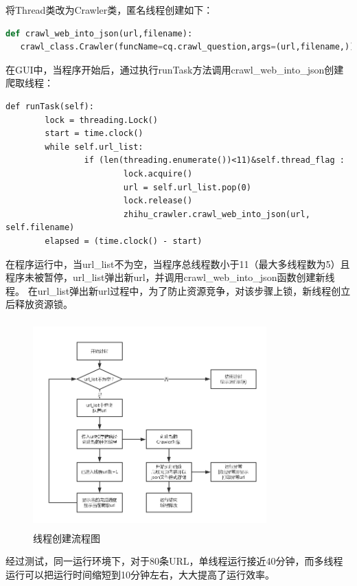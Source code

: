 \documentclass[UTF-8,a4paper, 12pt]{article}
\numberwithin{equation}{section}
\begin{document}
将Thread类改为Crawler类，匿名线程创建如下：
\begin{lstlisting}[language=python]
def crawl_web_into_json(url,filename):
   crawl_class.Crawler(funcName=cq.crawl_question,args=(url,filename,)).start()

\end{lstlisting}
在GUI中，当程序开始后，通过执行runTask方法调用crawl\_web\_into\_json创建爬取线程：
\begin{lstlisting}[]
def runTask(self):
		lock = threading.Lock()
		start = time.clock()
		while self.url_list:
				if (len(threading.enumerate())<11)&self.thread_flag :
						lock.acquire()
						url = self.url_list.pop(0)
						lock.release()
						zhihu_crawler.crawl_web_into_json(url, self.filename)
		elapsed = (time.clock() - start)

\end{lstlisting}

在程序运行中，当url\_list不为空，当程序总线程数小于11（最大多线程数为5）且程序未被暂停，url\_list弹出新url，并调用crawl\_web\_into\_json函数创建新线程。
在url\_list弹出新url过程中，为了防止资源竞争，对该步骤上锁，新线程创立后释放资源锁。
\begin{figure}[!htbp]
  \centering
  \includegraphics[width=9cm,height=8cm]{线程创建}
  \caption{线程创建流程图}\label{线程创建}
\end{figure}

经过测试，同一运行环境下，对于80条URL，单线程运行接近40分钟，而多线程运行可以把运行时间缩短到10分钟左右，大大提高了运行效率。
\newpage
\end{document}
